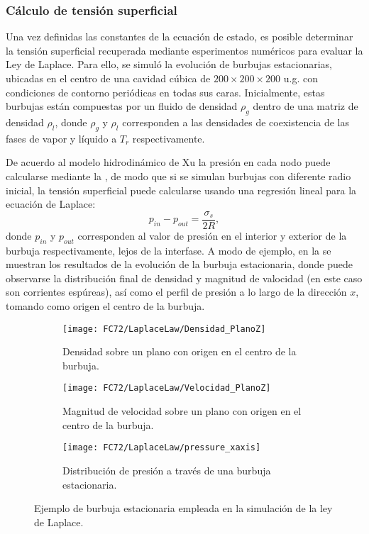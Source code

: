 \subsubsection{C\'alculo de tensi\'on superficial}

Una vez definidas las constantes de la ecuaci\'on de estado, es posible determinar la tensi\'on superficial recuperada mediante esperimentos num\'ericos para evaluar la Ley de Laplace. Para ello, se simul\'o la evoluci\'on de burbujas estacionarias, ubicadas en el centro de una cavidad c\'ubica de $200 \times 200 \times 200$ u.g. con condiciones de contorno peri\'odicas en todas sus caras. Inicialmente, estas burbujas est\'an compuestas por un fluido de densidad $\rho_g$ dentro de una matriz de densidad $\rho_l$, donde $\rho_g$ y $\rho_l$ corresponden a las densidades de coexistencia de las fases de vapor y l\'iquido a $T_r$ respectivamente.

De acuerdo al modelo hidrodin\'amico de Xu la presi\'on en cada nodo puede calcularse mediante la , de modo que si se simulan burbujas con diferente radio inicial, la tensi\'on superficial puede calcularse usando una regresi\'on lineal para la ecuaci\'on de Laplace:
\begin{equation}
	p_{in}-p_{out} = \dfrac{\sigma_s}{2 R},
\end{equation}
donde $p_{in}$ y $p_{out}$ corresponden al valor de presi\'on en el interior y exterior de la burbuja respectivamente, lejos de la interfase. A modo de ejemplo, en la  se muestran los resultados de la evoluci\'on de la burbuja estacionaria, donde puede observarse la distribuci\'on final de densidad y magnitud de valocidad (en este caso son corrientes esp\'ureas), as\'i como el perfil de presi\'on a lo largo de la direcci\'on $x$, tomando como origen el centro de la burbuja.
\begin{figure}[htb]
    \centering
    \begin{subfigure}[t]{0.45\textwidth}
        \centering
        \texttt{[image: FC72/LaplaceLaw/Densidad\_PlanoZ]}
        \caption{Densidad sobre un plano con origen en el centro de la burbuja.}
    \end{subfigure}
    \begin{subfigure}[t]{0.45\textwidth}
        \centering
        \texttt{[image: FC72/LaplaceLaw/Velocidad\_PlanoZ]}
        \caption{Magnitud de velocidad sobre un plano con origen en el centro de la burbuja.}
    \end{subfigure}
    \begin{subfigure}[t]{0.45\textwidth}
        \centering
        \texttt{[image: FC72/LaplaceLaw/pressure\_xaxis]}
        \caption{Distribuci\'on de presi\'on  a trav\'es de una burbuja estacionaria.}
    \end{subfigure}    
    \caption{Ejemplo de burbuja estacionaria empleada en la simulaci\'on de la ley de Laplace.}
    \label{fig:laplace_1_3D}
\end{figure}

